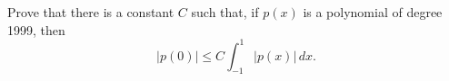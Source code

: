 Prove that there is a constant $C$ such that, if $p(x)$ is a polynomial
of degree 1999, then
\[|p(0)|\leq C \int_{-1}^1 |p(x)|\,dx.\]
